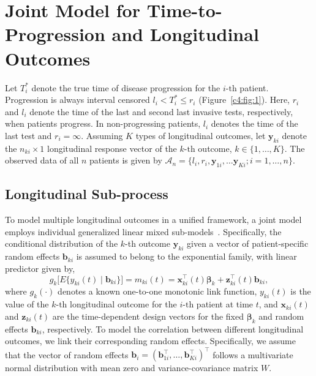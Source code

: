 \section{Joint Model for Time-to-Progression and Longitudinal Outcomes}
\label{c4:sec:jointmodel}
Let $T_i^*$ denote the true time of disease progression for the ${i\mbox{-th}}$ patient. Progression is always interval censored ${l_i < T_i^* \leq r_i}$ (Figure~\ref{c4:fig:1}). Here, $r_i$ and $l_i$ denote the time of the last and second last invasive tests, respectively, when patients progress. In non-progressing patients, $l_i$ denotes the time of the last test and ${r_i=\infty}$. Assuming $K$ types of longitudinal outcomes, let $\boldsymbol{y}_{ki}$ denote the ${n_{ki} \times 1}$ longitudinal response vector of the ${k\mbox{-th}}$ outcome, $k \in \{1, \ldots, K\}$. The observed data of all $n$ patients is given by ${\mathcal{A}_n = \{l_i, r_i, \boldsymbol{y}_{1i},\ldots \boldsymbol{y}_{Ki}; i = 1, \ldots, n\}}$.

\subsection{Longitudinal Sub-process}
To model multiple longitudinal outcomes in a unified framework, a joint model employs individual generalized linear mixed sub-models~\citep{mcculloch2005generalized}. Specifically, the conditional distribution of the $k$-th outcome $\boldsymbol{y}_{ki}$ given a vector of patient-specific random effects $\boldsymbol{b}_{ki}$ is assumed to belong to the exponential family, with linear predictor given by,
\begin{equation*}
\label{c4:eq:long_model}
g_k\big[E\{y_{ki} (t) \mid \boldsymbol{b}_{ki}\}\big] = m_{ki}(t) = \boldsymbol{x}_{ki}^{\top}(t)\boldsymbol{\beta}_{k} + \boldsymbol{z}_{ki}^{\top}(t)\boldsymbol{b}_{ki},
\end{equation*}
where $g_k(\cdot)$ denotes a known one-to-one monotonic link function, $y_{ki}(t)$ is the
value of the ${k\mbox{-th}}$ longitudinal outcome for the ${i\mbox{-th}}$ patient at time $t$, and $\boldsymbol{x}_{ki}(t)$ and $\boldsymbol{z}_{ki}(t)$ are the time-dependent design vectors for the fixed $\boldsymbol{\beta}_{k}$ and random effects $\boldsymbol{b}_{ki}$, respectively. To model the correlation between different longitudinal outcomes, we link their corresponding random effects. Specifically, we assume that the vector of random effects ${\boldsymbol{b}_{i} = (\boldsymbol{b}_{1i}^{\top}, \ldots, \boldsymbol{b}_{Ki}^{\top})^{\top}}$ follows a multivariate normal distribution with mean zero and variance-covariance matrix $W$.

